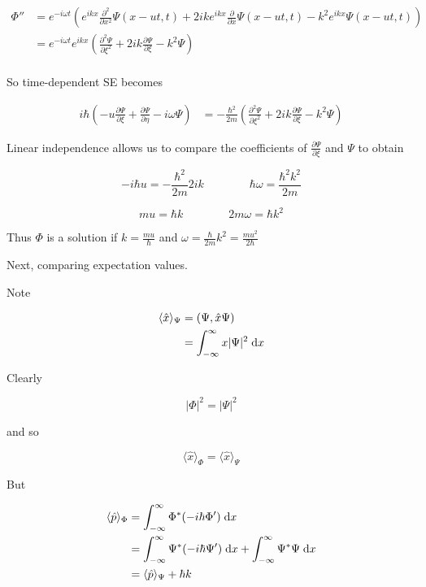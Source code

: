 \documentclass[a4paper]{article}
\begin{document}
\begin{align*}
\Phi'' & = e^{- i \omega t} \left(  e^{i k x } \frac{\partial^{2} }{\partial x^{2}} \Psi(x - ut,t) + 2 i k e^{i k x} \frac{\partial }{\partial x}\Psi(x-ut,t)  - k^{2} e^{i k x} \Psi(x-ut,t)  \right)   \\ 
& = e^{- i \omega t}  e^{i k x } \left( \frac{\partial^{2} \Psi }{\partial \xi^{2}} + 2 i k \frac{\partial \Psi }{\partial \xi}  - k^{2} \Psi  \right)   \\ 
\end{align*}


So time-dependent SE becomes

\begin{align*}
i \hbar \left(  - u \frac{\partial \Psi }{\partial \xi} +\frac{\partial \Psi}{\partial \eta}   - i \omega \Psi \right)  & = - \frac{\hbar^{2}}{2m} \left( \frac{\partial^{2} \Psi }{\partial \xi^{2}} + 2 i k \frac{\partial \Psi }{\partial \xi}  - k^{2} \Psi  \right) 
\end{align*}

Linear independence allows us to compare the coefficients of $ \frac{\partial \Psi }{\partial \xi}  $ and $ \Psi $ to obtain

\[ - i \hbar u = - \frac{\hbar^{2}}{2m} 2 i k  \qquad \qquad  \hbar \omega =  \frac{\hbar^{2} k^{2}}{2m} \]

\[  m u = \hbar k \qquad \qquad 2m \omega = \hbar k^{2} \]

Thus $ \Phi $ is a solution if $ k = \frac{m u}{\hbar} $ and $ \omega = \frac{\hbar}{2m} k^{2} = \frac{m u^{2}}{2 \hbar} $

Next, comparing expectation values. 

Note

\begin{align*}
\langle \hat{x} \rangle_{\Psi} & =  (\Psi, \hat{x} \Psi)\\
& = \int_{-\infty}^{\infty} x | \Psi |^{2} \; \mathrm{d} x
\end{align*}

Clearly

\[ | \Phi |^{2} = | \Psi |^{2}  \]

and so

\[ \langle \hat{x} \rangle_{\Phi} = \langle \hat{x} \rangle_{\Psi} \]

But

\begin{align*}
\langle \hat{p} \rangle_{\Phi}& = \int_{-\infty}^{\infty} \Phi^{*} ( - i \hbar \Phi') \; \mathrm{d} x   \\
& = \int_{-\infty}^{\infty} \Psi^{*} ( - i \hbar \Psi') \; \mathrm{d} x  + \int_{-\infty}^{\infty} \Psi^{*} \Psi \; \mathrm{d} x  \\
& = \langle \hat{p} \rangle_{\Psi} + \hbar k
\end{align*}
\end{document}
